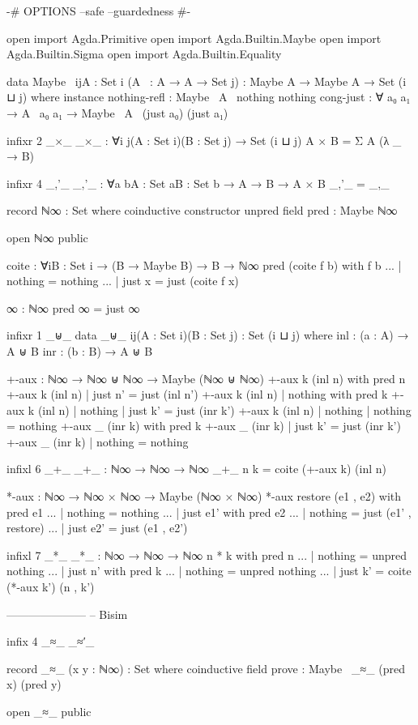 \begin{code}[hide]
{-# OPTIONS --safe --guardedness #-}

open import Agda.Primitive
open import Agda.Builtin.Maybe
open import Agda.Builtin.Sigma
open import Agda.Builtin.Equality

data Maybe~ {i}{j}{A : Set i} (A~ : A → A → Set j) : Maybe A → Maybe A → Set (i ⊔ j) where
  instance nothing-refl : Maybe~ A~ nothing nothing
  cong-just : ∀ {a₀ a₁} → A~ a₀ a₁ → Maybe~ A~ (just a₀) (just a₁)

infixr 2 _×_
_×_ : ∀{i j}(A : Set i)(B : Set j) → Set (i ⊔ j)
A × B = Σ A (λ _ → B)

infixr 4 _,'_
_,'_ : ∀{a b}{A : Set a}{B : Set b} → A → B → A × B
_,'_ = _,_

record ℕ∞ : Set where
  coinductive
  constructor unpred
  field
    pred : Maybe ℕ∞

open ℕ∞ public

coite : ∀{i}{B : Set i} → (B → Maybe B) → B → ℕ∞
pred (coite f b) with f b
... | nothing = nothing
... | just x  = just (coite f x)

∞ : ℕ∞
pred ∞ = just ∞

infixr 1 _⊎_
data _⊎_ {i}{j}(A : Set i)(B : Set j) : Set (i ⊔ j) where
  inl : (a : A) → A ⊎ B
  inr : (b : B) → A ⊎ B

+-aux : ℕ∞ → ℕ∞ ⊎ ℕ∞ → Maybe (ℕ∞ ⊎ ℕ∞)
+-aux k (inl n) with pred n
+-aux k (inl n) | just n' = just (inl n')
+-aux k (inl n) | nothing with pred k
+-aux k (inl n) | nothing | just k' = just (inr k')
+-aux k (inl n) | nothing | nothing = nothing
+-aux _ (inr k) with pred k
+-aux _ (inr k) | just k' = just (inr k')
+-aux _ (inr k) | nothing = nothing

infixl 6 _+_
_+_ : ℕ∞ → ℕ∞ → ℕ∞
_+_ n k = coite (+-aux k) (inl n)

*-aux : ℕ∞ → ℕ∞ × ℕ∞ → Maybe (ℕ∞ × ℕ∞)
*-aux restore (e1 , e2) with pred e1
... | nothing = nothing
... | just e1' with pred e2
... | nothing = just (e1' , restore)
... | just e2' = just (e1 , e2')

infixl 7 _*_
_*_ : ℕ∞ → ℕ∞ → ℕ∞
n * k with pred n
... | nothing = unpred nothing
... | just n' with pred k
... | nothing = unpred nothing
... | just k' = coite (*-aux k') (n , k')

---------------------
-- Bisim

infix 4 _≈_ _≈′_

record _≈_ (x y : ℕ∞) : Set where
  coinductive
  field prove : Maybe~ _≈_ (pred x) (pred y)

open _≈_ public


\end{code}
